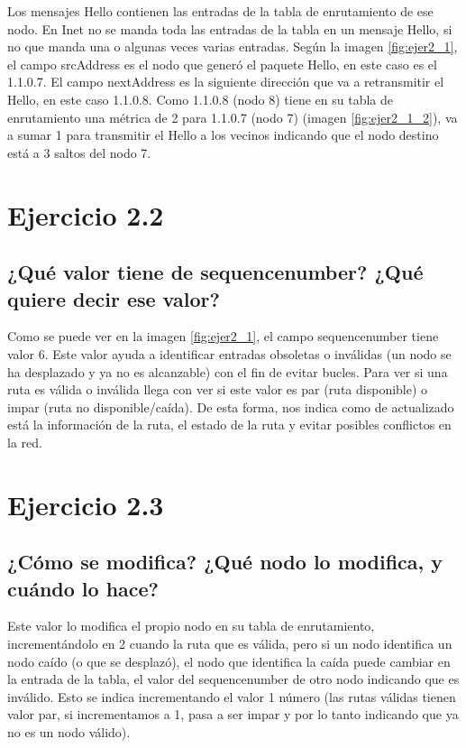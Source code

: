 Los mensajes Hello contienen las entradas de la tabla de enrutamiento de ese nodo. En Inet no se manda toda las entradas de la tabla en un mensaje Hello, si no que manda una o algunas veces varias entradas. Según la imagen \ref{fig:ejer2_1}, el campo srcAddress es el nodo que generó el paquete Hello, en este caso es el 1.1.0.7. El campo nextAddress es la siguiente dirección que va a retransmitir el Hello, en este caso 1.1.0.8. Como 1.1.0.8 (nodo 8) tiene en su tabla de enrutamiento una métrica de 2 para 1.1.0.7 (nodo 7) (imagen \ref{fig:ejer2_1_2}), va a sumar 1 para transmitir el Hello a los vecinos indicando que el nodo destino está a 3 saltos del nodo 7.



\section{Ejercicio 2.2}

\subsection{¿Qué valor tiene de sequencenumber? ¿Qué quiere decir ese valor?}

Como se puede ver en la imagen \ref{fig:ejer2_1}, el campo sequencenumber tiene valor 6. Este valor ayuda a identificar entradas obsoletas o inválidas (un nodo se ha desplazado y ya no es alcanzable) con el fin de evitar bucles. Para ver si una ruta es válida o inválida llega con ver si este valor es par (ruta disponible) o impar (ruta no disponible/caída). De esta forma, nos indica como de actualizado está la información de la ruta, el estado de la ruta y evitar posibles conflictos en la red.

\section{Ejercicio 2.3}

\subsection{¿Cómo se modifica? ¿Qué nodo lo modifica, y cuándo lo hace?}

Este valor lo modifica el propio nodo en su tabla de enrutamiento, incrementándolo en 2 cuando la ruta que es válida, pero si un nodo identifica un nodo caído (o que se desplazó), el nodo que identifica la caída puede cambiar en la entrada de la tabla, el valor del sequencenumber de otro nodo indicando que es inválido. Esto se indica incrementando el valor 1 número (las rutas válidas tienen valor par, si incrementamos a 1, pasa a ser impar y por lo tanto indicando que ya no es un nodo válido). 

